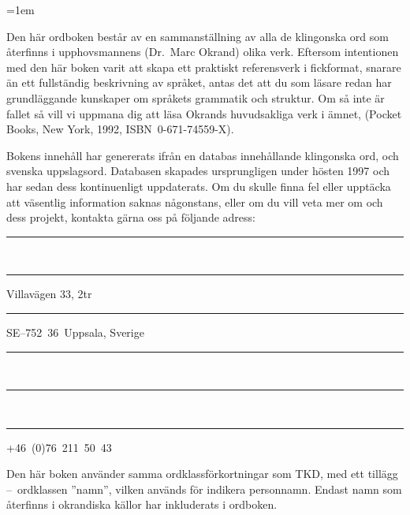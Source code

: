 %
%
%

\parindent=1em                                  %

\raggedbottom



\noindent Den här ordboken består av en sammanställning av alla de
klingonska ord som återfinns i upphovsmannens (Dr.\ Marc Okrand) olika
verk. Eftersom intentionen med den här boken varit att skapa ett
praktiskt referensverk i fickformat, snarare än ett fullständig
beskrivning av språket, antas det att du som läsare redan har
grundläggande kunskaper om språkets grammatik och struktur. Om så inte
är fallet så vill vi uppmana dig att läsa Okrands huvudsakliga verk i
ämnet,  (Pocket Books, New York, 1992,
ISBN~0-671-74559-X).

Bokens innehåll har genererats ifrån en databas innehållande
\fromkliwords{} klingonska ord, och \tokliwords{} svenska
uppslagsord. Databasen skapades ursprungligen under hösten 1997 och
har sedan dess kontinuenligt uppdaterats. Om du skulle finna fel eller
upptäcka att väsentlig information saknas någonstans, eller om du vill
veta mer om  och dess projekt,
kontakta gärna oss på följande adress:

\vspace{3mm}%
\noindent\parbox[t]{.5\textwidth}{%
  \rule{1cm}{0mm}\\
  \rule{1cm}{0mm}Villavägen 33, 2tr\\
  \rule{1cm}{0mm}SE--752~36~Uppsala, Sverige%
}%
\parbox[t]{.5\textwidth}{%
  \rule{1cm}{0mm}\\
  \rule{1cm}{0mm}\\
  \rule{1cm}{0mm}+46~(0)76~211~50~43%
}



\noindent Den här boken använder samma ordklassförkortningar som TKD,
med ett tillägg --~ordklassen ''namn'', vilken används för indikera
personnamn. Endast namn som återfinns i okrandiska källor har
inkluderats i ordboken.

